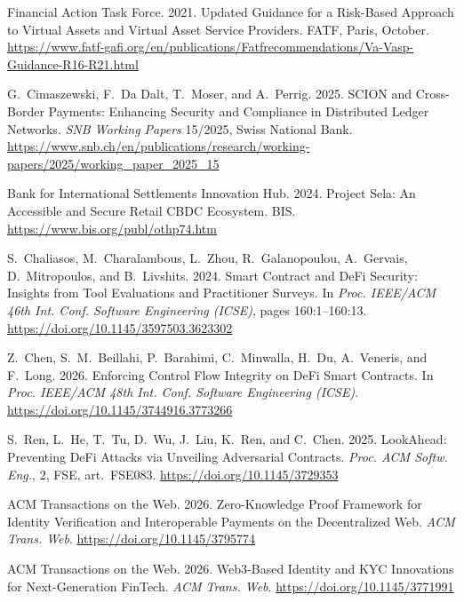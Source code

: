 \documentclass[12pt, a4paper]{report}
\begin{document}
{\begin{enumerate}[label={[\arabic*]}]
\item Financial Action Task Force. 2021. Updated Guidance for a Risk-Based Approach to Virtual Assets and Virtual Asset Service Providers. FATF, Paris, October. \url{https://www.fatf-gafi.org/en/publications/Fatfrecommendations/Va-Vasp-Guidance-R16-R21.html}

\item G.~Cimaszewski, F.~Da Dalt, T.~Moser, and A.~Perrig. 2025. SCION and Cross-Border Payments: Enhancing Security and Compliance in Distributed Ledger Networks. \emph{SNB Working Papers} 15/2025, Swiss National Bank. \url{https://www.snb.ch/en/publications/research/working-papers/2025/working_paper_2025_15}

\item Bank for International Settlements Innovation Hub. 2024. Project Sela: An Accessible and Secure Retail CBDC Ecosystem. BIS. \url{https://www.bis.org/publ/othp74.htm}

\item S.~Chaliasos, M.~Charalambous, L.~Zhou, R.~Galanopoulou, A.~Gervais, D.~Mitropoulos, and B.~Livshits. 2024. Smart Contract and DeFi Security: Insights from Tool Evaluations and Practitioner Surveys. In \emph{Proc. IEEE/ACM 46th Int. Conf. Software Engineering (ICSE)}, pages 160:1--160:13. \url{https://doi.org/10.1145/3597503.3623302}

\item Z.~Chen, S.~M.~Beillahi, P.~Barahimi, C.~Minwalla, H.~Du, A.~Veneris, and F.~Long. 2026. Enforcing Control Flow Integrity on DeFi Smart Contracts. In \emph{Proc. IEEE/ACM 48th Int. Conf. Software Engineering (ICSE)}. \url{https://doi.org/10.1145/3744916.3773266}

\item S.~Ren, L.~He, T.~Tu, D.~Wu, J.~Liu, K.~Ren, and C.~Chen. 2025. LookAhead: Preventing DeFi Attacks via Unveiling Adversarial Contracts. \emph{Proc. ACM Softw. Eng.}, 2, FSE, art.~FSE083. \url{https://doi.org/10.1145/3729353}

\item ACM Transactions on the Web. 2026. Zero-Knowledge Proof Framework for Identity Verification and Interoperable Payments on the Decentralized Web. \emph{ACM Trans. Web}. \url{https://doi.org/10.1145/3795774}

\item ACM Transactions on the Web. 2026. Web3-Based Identity and KYC Innovations for Next-Generation FinTech. \emph{ACM Trans. Web}. \url{https://doi.org/10.1145/3771991}


\end{enumerate}}
\end{document}
